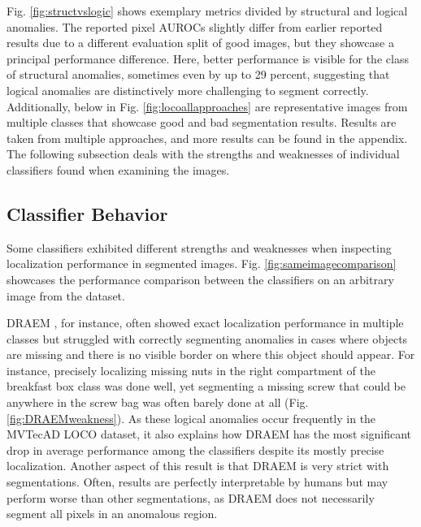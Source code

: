 Fig. \ref{fig:structvslogic} shows exemplary metrics divided by structural and logical anomalies. The reported pixel AUROCs slightly differ from earlier reported results due to a different 
evaluation split of good images, but they showcase a principal performance difference. Here, better performance is visible for the 
class of structural anomalies, sometimes even by up to 29 percent, suggesting that logical anomalies are distinctively more challenging to segment correctly.\newline
Additionally, below in Fig. \ref{fig:locoallapproaches} are representative images from multiple classes that showcase good and bad segmentation results. 
Results are taken from multiple approaches, and more results can be found in the appendix. The following subsection deals with the strengths and weaknesses of 
individual classifiers found when examining the images.

%
%




\subsection{Classifier Behavior}
\label{subsec:classifierbehavior}

Some classifiers exhibited different strengths and weaknesses when inspecting localization performance in segmented images. Fig. \ref{fig:sameimagecomparison} showcases 
the performance comparison between the classifiers on an arbitrary image from the dataset.



DRAEM \cite{Zavrtanik_2021DRAEM}, for instance, often showed exact localization performance in multiple classes but struggled 
with correctly segmenting anomalies in cases where objects are missing and there is no visible border on where this object should 
appear. For instance, precisely localizing missing nuts in the right compartment of the breakfast box class was done well, yet 
segmenting a missing screw that could be anywhere in the screw bag was often barely done at all (Fig. \ref{fig:DRAEMweakness}). As these logical anomalies occur 
frequently in the MVTecAD LOCO \cite{LOCODentsAndScratchesBergmann2022} dataset, it also explains how DRAEM 
has the most significant drop in average performance among the classifiers despite its mostly precise localization. Another aspect of this result is that DRAEM is very strict with 
segmentations. Often, results are perfectly interpretable by humans but may perform worse than other segmentations, as DRAEM does not necessarily segment all pixels in 
an anomalous region.


